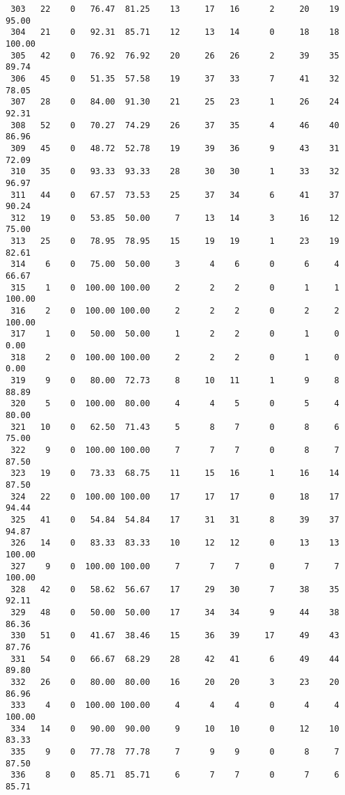 \begin{verbatim}
 303   22    0   76.47  81.25    13     17   16      2     20    19    95.00
 304   21    0   92.31  85.71    12     13   14      0     18    18   100.00
 305   42    0   76.92  76.92    20     26   26      2     39    35    89.74
 306   45    0   51.35  57.58    19     37   33      7     41    32    78.05
 307   28    0   84.00  91.30    21     25   23      1     26    24    92.31
 308   52    0   70.27  74.29    26     37   35      4     46    40    86.96
 309   45    0   48.72  52.78    19     39   36      9     43    31    72.09
 310   35    0   93.33  93.33    28     30   30      1     33    32    96.97
 311   44    0   67.57  73.53    25     37   34      6     41    37    90.24
 312   19    0   53.85  50.00     7     13   14      3     16    12    75.00
 313   25    0   78.95  78.95    15     19   19      1     23    19    82.61
 314    6    0   75.00  50.00     3      4    6      0      6     4    66.67
 315    1    0  100.00 100.00     2      2    2      0      1     1   100.00
 316    2    0  100.00 100.00     2      2    2      0      2     2   100.00
 317    1    0   50.00  50.00     1      2    2      0      1     0     0.00
 318    2    0  100.00 100.00     2      2    2      0      1     0     0.00
 319    9    0   80.00  72.73     8     10   11      1      9     8    88.89
 320    5    0  100.00  80.00     4      4    5      0      5     4    80.00
 321   10    0   62.50  71.43     5      8    7      0      8     6    75.00
 322    9    0  100.00 100.00     7      7    7      0      8     7    87.50
 323   19    0   73.33  68.75    11     15   16      1     16    14    87.50
 324   22    0  100.00 100.00    17     17   17      0     18    17    94.44
 325   41    0   54.84  54.84    17     31   31      8     39    37    94.87
 326   14    0   83.33  83.33    10     12   12      0     13    13   100.00
 327    9    0  100.00 100.00     7      7    7      0      7     7   100.00
 328   42    0   58.62  56.67    17     29   30      7     38    35    92.11
 329   48    0   50.00  50.00    17     34   34      9     44    38    86.36
 330   51    0   41.67  38.46    15     36   39     17     49    43    87.76
 331   54    0   66.67  68.29    28     42   41      6     49    44    89.80
 332   26    0   80.00  80.00    16     20   20      3     23    20    86.96
 333    4    0  100.00 100.00     4      4    4      0      4     4   100.00
 334   14    0   90.00  90.00     9     10   10      0     12    10    83.33
 335    9    0   77.78  77.78     7      9    9      0      8     7    87.50
 336    8    0   85.71  85.71     6      7    7      0      7     6    85.71

\end{verbatim}

